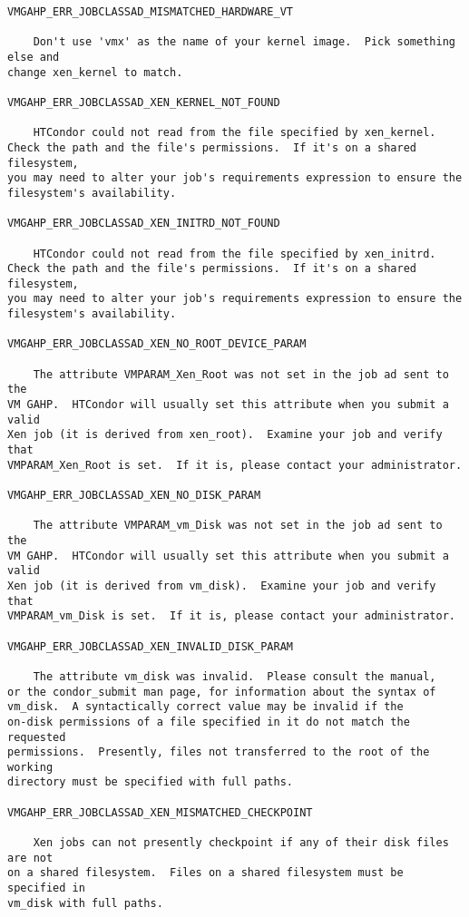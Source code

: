 \begin{verbatim}
VMGAHP_ERR_JOBCLASSAD_MISMATCHED_HARDWARE_VT

    Don't use 'vmx' as the name of your kernel image.  Pick something else and
change xen_kernel to match.

VMGAHP_ERR_JOBCLASSAD_XEN_KERNEL_NOT_FOUND

    HTCondor could not read from the file specified by xen_kernel.
Check the path and the file's permissions.  If it's on a shared filesystem,
you may need to alter your job's requirements expression to ensure the
filesystem's availability.

VMGAHP_ERR_JOBCLASSAD_XEN_INITRD_NOT_FOUND

    HTCondor could not read from the file specified by xen_initrd.
Check the path and the file's permissions.  If it's on a shared filesystem,
you may need to alter your job's requirements expression to ensure the
filesystem's availability.

VMGAHP_ERR_JOBCLASSAD_XEN_NO_ROOT_DEVICE_PARAM

    The attribute VMPARAM_Xen_Root was not set in the job ad sent to the
VM GAHP.  HTCondor will usually set this attribute when you submit a valid
Xen job (it is derived from xen_root).  Examine your job and verify that
VMPARAM_Xen_Root is set.  If it is, please contact your administrator.

VMGAHP_ERR_JOBCLASSAD_XEN_NO_DISK_PARAM

    The attribute VMPARAM_vm_Disk was not set in the job ad sent to the
VM GAHP.  HTCondor will usually set this attribute when you submit a valid
Xen job (it is derived from vm_disk).  Examine your job and verify that
VMPARAM_vm_Disk is set.  If it is, please contact your administrator.

VMGAHP_ERR_JOBCLASSAD_XEN_INVALID_DISK_PARAM

    The attribute vm_disk was invalid.  Please consult the manual,
or the condor_submit man page, for information about the syntax of
vm_disk.  A syntactically correct value may be invalid if the
on-disk permissions of a file specified in it do not match the requested
permissions.  Presently, files not transferred to the root of the working
directory must be specified with full paths.

VMGAHP_ERR_JOBCLASSAD_XEN_MISMATCHED_CHECKPOINT

    Xen jobs can not presently checkpoint if any of their disk files are not
on a shared filesystem.  Files on a shared filesystem must be specified in
vm_disk with full paths.

\end{verbatim}

